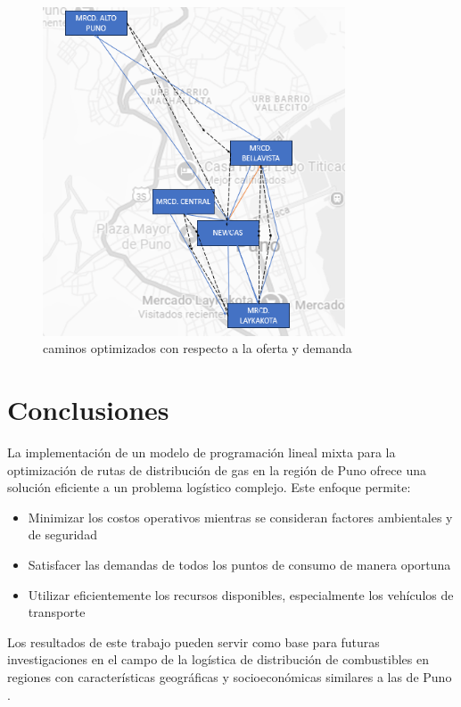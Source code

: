 \documentclass[11pt, a4paper]{article}
\begin{document}
\begin{figure}[H]
\centering
\includegraphics[width=0.8\textwidth]{Captura de pantalla 2025-05-14 122727.png}
\caption{caminos optimizados con respecto a la oferta y demanda}
\label{fig:optimizacion}
\end{figure}

\section{Conclusiones}
La implementación de un modelo de programación lineal mixta para la optimización de rutas de distribución de gas en la región de Puno ofrece una solución eficiente a un problema logístico complejo. Este enfoque permite:

\begin{itemize}[leftmargin=*]
    \item Minimizar los costos operativos mientras se consideran factores ambientales y de seguridad
    \item Satisfacer las demandas de todos los puntos de consumo de manera oportuna
    \item Utilizar eficientemente los recursos disponibles, especialmente los vehículos de transporte
\end{itemize}

Los resultados de este trabajo pueden servir como base para futuras investigaciones en el campo de la logística de distribución de combustibles en regiones con características geográficas y socioeconómicas similares a las de Puno \citep{Cornejo2018}.
\end{document}
